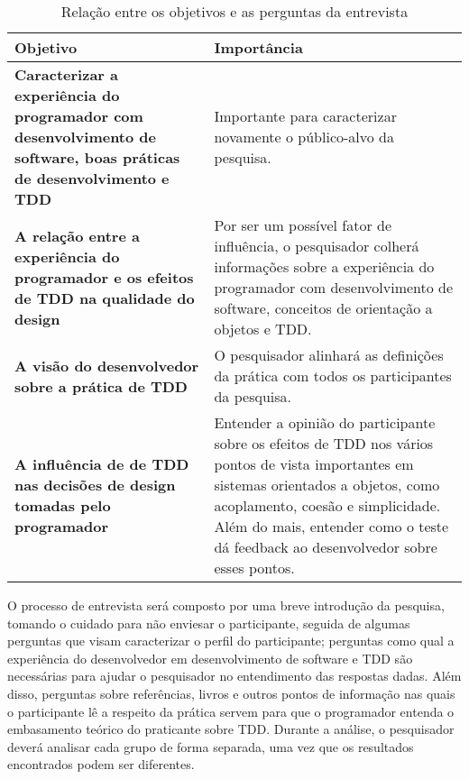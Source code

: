 \begin{table}[h!]
	\begin{tabular}{ | p{6cm} | p{7cm} | }
		\hline
		
		Objetivo & Importância \\
		
		\hline
		\textbf{Caracterizar a experiência do programador com desenvolvimento de
		software, boas práticas de desenvolvimento e TDD} 
		&
		Importante para caracterizar novamente o público-alvo da pesquisa.

		\\

		\hline
		\textbf{A relação entre a experiência do programador e os efeitos de TDD
		na qualidade do design} 
		&
		Por ser um possível fator de influência, o pesquisador colherá
		informações sobre a experiência do programador com desenvolvimento de software, 
		conceitos de orientação a objetos e TDD.

		\\

		\hline
		\textbf{A visão do desenvolvedor sobre a prática de TDD} 
		&
		O pesquisador alinhará as definições da prática com todos os participantes da
		pesquisa.

		\\

		\hline
		\textbf{A influência de de TDD nas decisões de design tomadas pelo programador} 
		&
		Entender a opinião do participante sobre os efeitos de TDD
		nos vários pontos de vista importantes em sistemas orientados a objetos, como
		acoplamento, coesão e simplicidade. Além do mais, entender como o teste
		dá feedback ao desenvolvedor sobre esses pontos.
		
		\\

		\hline												
	\end{tabular}
	\caption{Relação entre os objetivos e as perguntas da entrevista}
	\label{tab:questoes}
\end{table}

O processo de entrevista será composto por uma breve introdução da pesquisa, tomando
o cuidado para não enviesar o participante, seguida de algumas perguntas que visam
caracterizar o perfil do participante; perguntas como qual a experiência do
desenvolvedor em desenvolvimento de software e TDD são necessárias para ajudar o
pesquisador no entendimento das respostas dadas. Além disso, perguntas sobre
referências, livros e outros pontos de informação nas quais o participante lê a
respeito da prática servem para que o programador entenda o embasamento teórico
do praticante sobre TDD. Durante a análise, o pesquisador deverá analisar cada
grupo de forma separada, uma vez que os resultados encontrados podem ser
diferentes.

